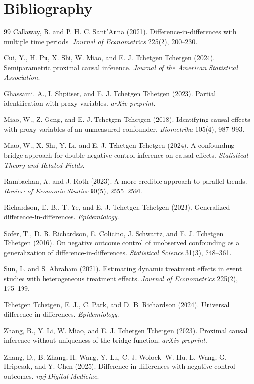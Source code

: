 \documentclass[11pt]{article}
\theoremstyle{definition}
\theoremstyle{plain}
\theoremstyle{remark}
\begin{document}
\section*{Bibliography}
\begin{thebibliography}{99}
Callaway, B. and P. H. C. Sant'Anna (2021). Difference-in-differences with multiple time periods. \emph{Journal of Econometrics} 225(2), 200--230.

Cui, Y., H. Pu, X. Shi, W. Miao, and E. J. Tchetgen Tchetgen (2024). Semiparametric proximal causal inference. \emph{Journal of the American Statistical Association}.

Ghassami, A., I. Shpitser, and E. J. Tchetgen Tchetgen (2023). Partial identification with proxy variables. \emph{arXiv preprint}.

Miao, W., Z. Geng, and E. J. Tchetgen Tchetgen (2018). Identifying causal effects with proxy variables of an unmeasured confounder. \emph{Biometrika} 105(4), 987--993.

Miao, W., X. Shi, Y. Li, and E. J. Tchetgen Tchetgen (2024). A confounding bridge approach for double negative control inference on causal effects. \emph{Statistical Theory and Related Fields}.

Rambachan, A. and J. Roth (2023). A more credible approach to parallel trends. \emph{Review of Economic Studies} 90(5), 2555--2591.

Richardson, D. B., T. Ye, and E. J. Tchetgen Tchetgen (2023). Generalized difference-in-differences. \emph{Epidemiology}.

Sofer, T., D. B. Richardson, E. Colicino, J. Schwartz, and E. J. Tchetgen Tchetgen (2016). On negative outcome control of unobserved confounding as a generalization of difference-in-differences. \emph{Statistical Science} 31(3), 348--361.

Sun, L. and S. Abraham (2021). Estimating dynamic treatment effects in event studies with heterogeneous treatment effects. \emph{Journal of Econometrics} 225(2), 175--199.

Tchetgen Tchetgen, E. J., C. Park, and D. B. Richardson (2024). Universal difference-in-differences. \emph{Epidemiology}.

Zhang, B., Y. Li, W. Miao, and E. J. Tchetgen Tchetgen (2023). Proximal causal inference without uniqueness of the bridge function. \emph{arXiv preprint}.

Zhang, D., B. Zhang, H. Wang, Y. Lu, C. J. Wolock, W. Hu, L. Wang, G. Hripcsak, and Y. Chen (2025). Difference-in-differences with negative control outcomes. \emph{npj Digital Medicine}.
\end{thebibliography}
\end{document}
